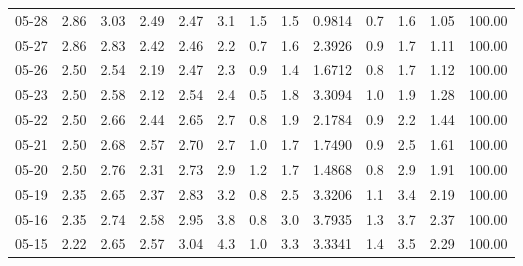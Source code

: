\begin{threeparttable}
{\begin{tabular}{lrrrrrrrrrrrr}
  05-28 &          2.86 &          3.03 &          2.49 &        2.47 &                 3.1 &                 1.5 &        1.5 &       0.9814 &                 0.7 &              1.6 &            1.05 &                 100.00 \\
  05-27 &          2.86 &          2.83 &          2.42 &        2.46 &                 2.2 &                 0.7 &        1.6 &       2.3926 &                 0.9 &              1.7 &            1.11 &                 100.00 \\
  05-26 &          2.50 &          2.54 &          2.19 &        2.47 &                 2.3 &                 0.9 &        1.4 &       1.6712 &                 0.8 &              1.7 &            1.12 &                 100.00 \\
  05-23 &          2.50 &          2.58 &          2.12 &        2.54 &                 2.4 &                 0.5 &        1.8 &       3.3094 &                 1.0 &              1.9 &            1.28 &                 100.00 \\
  05-22 &          2.50 &          2.66 &          2.44 &        2.65 &                 2.7 &                 0.8 &        1.9 &       2.1784 &                 0.9 &              2.2 &            1.44 &                 100.00 \\
  05-21 &          2.50 &          2.68 &          2.57 &        2.70 &                 2.7 &                 1.0 &        1.7 &       1.7490 &                 0.9 &              2.5 &            1.61 &                 100.00 \\
  05-20 &          2.50 &          2.76 &          2.31 &        2.73 &                 2.9 &                 1.2 &        1.7 &       1.4868 &                 0.8 &              2.9 &            1.91 &                 100.00 \\
  05-19 &          2.35 &          2.65 &          2.37 &        2.83 &                 3.2 &                 0.8 &        2.5 &       3.3206 &                 1.1 &              3.4 &            2.19 &                 100.00 \\
  05-16 &          2.35 &          2.74 &          2.58 &        2.95 &                 3.8 &                 0.8 &        3.0 &       3.7935 &                 1.3 &              3.7 &            2.37 &                 100.00 \\
  05-15 &          2.22 &          2.65 &          2.57 &        3.04 &                 4.3 &                 1.0 &        3.3 &       3.3341 &                 1.4 &              3.5 &            2.29 &                 100.00 \\

\end{tabular}}
\end{threeparttable}
